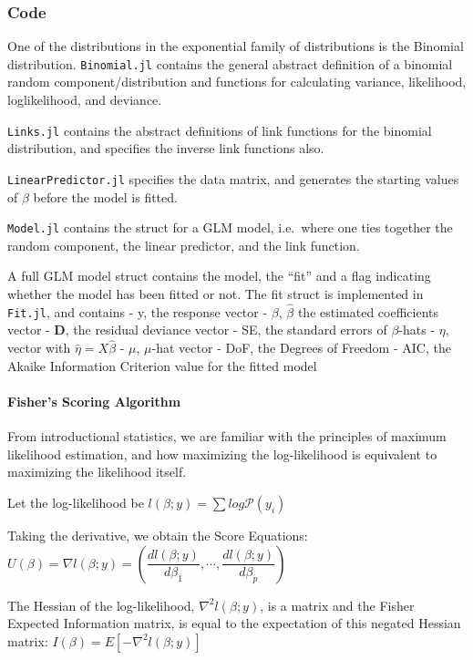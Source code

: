 \documentclass[]{article}
\let\oldparagraph\paragraph
\renewcommand{\paragraph}[1]{\oldparagraph{#1}\mbox{}}
\begin{document}
\subsubsection{Code}\label{code-1}

One of the distributions in the exponential family of distributions is
the Binomial distribution. \texttt{Binomial.jl} contains the general
abstract definition of a binomial random component/distribution and
functions for calculating variance, likelihood, loglikelihood, and
deviance.

\texttt{Links.jl} contains the abstract definitions of link functions
for the binomial distribution, and specifies the inverse link functions
also.

\texttt{LinearPredictor.jl} specifies the data matrix, and generates the
starting values of \(\beta\) before the model is fitted.

\texttt{Model.jl} contains the struct for a GLM model, i.e.~where one
ties together the random component, the linear predictor, and the link
function.

A full GLM model struct contains the model, the ``fit'' and a flag
indicating whether the model has been fitted or not. The fit struct is
implemented in \texttt{Fit.jl}, and contains - y, the response vector -
\(\beta\), \(\hat{\beta}\) the estimated coefficients vector -
\(\mathbf{D}\), the residual deviance vector - SE, the standard errors
of \(\beta\)-hats - \(\eta\), vector with \(\hat{\eta}= X\hat{\beta}\) -
\(\mu\), \(\mu\)-hat vector - DoF, the Degrees of Freedom - AIC, the
Akaike Information Criterion value for the fitted model

\paragraph{Fisher's Scoring Algorithm}\label{fishers-scoring-algorithm}

From introductional statistics, we are familiar with the principles of
maximum likelihood estimation, and how maximizing the log-likelihood is
equivalent to maximizing the likelihood itself.

Let the log-likelihood be \(l(\beta; y) = \sum log \mathcal{P}(y_i)\)

Taking the derivative, we obtain the Score Equations:
\(U(\beta) = \nabla l(\beta; y) = ( \dfrac{dl(\beta; y)}{d\beta_1}, \cdots, \dfrac{dl(\beta; y)}{d\beta_p})\)

The Hessian of the log-likelihood, \(\nabla^2 l(\beta; y)\), is a matrix
and the Fisher Expected Information matrix, is equal to the expectation
of this negated Hessian matrix: \(I(\beta) = E[- \nabla^2 l(\beta; y)]\)
\end{document}
